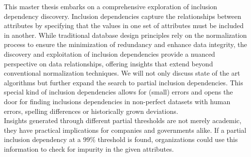 \noindent This master thesis embarks on a comprehensive exploration of inclusion dependency discovery. Inclusion dependencies capture the relationships between attributes by specifying that the values in one set of attributes must be included in another. While traditional database design principles rely on the normalization process to ensure the minimization of redundancy and enhance data integrity, the discovery and exploitation of inclusion dependencies provide a nuanced perspective on data relationships, offering insights that extend beyond conventional normalization techniques. We will not only discuss state of the art algorithms but further expand the search to partial inclusion dependencies. This special kind of inclusion dependencies allows for (small) errors and opens the door for finding inclusions dependencies in non-perfect datasets with human errors, spelling differences or historically grown deviations. \\

\noindent Insights generated through different partial thresholds are not merely academic, they have practical implications for companies and governments alike. If a partial inclusion dependency at a $99\%$ threshold is found, organizations could use this information to check for impurity in the given attributes.